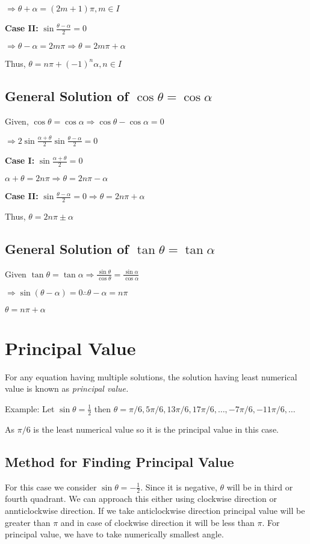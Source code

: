 $\Rightarrow \theta + \alpha = (2m + 1)\pi, m\in I$

{\bf Case II:} $\sin\frac{\theta - \alpha}{2} = 0$

$\Rightarrow \theta - \alpha = 2m\pi \Rightarrow \theta = 2m\pi + \alpha$

Thus, $\theta = n\pi + (-1)^n\alpha, n\in I$

\subsection{General Solution of $\cos\theta = \cos\alpha$}
Given, $\cos\theta = \cos\alpha \Rightarrow \cos\theta - \cos\alpha = 0$


$\Rightarrow 2\sin\frac{\alpha + \theta}{2}\sin\frac{\theta - \alpha}{2} = 0$

{\bf Case I:} $\sin\frac{\alpha + \theta}{2} = 0$

$\alpha + \theta = 2n\pi \Rightarrow \theta = 2n\pi - \alpha$

{\bf Case II:} $\sin\frac{\theta - \alpha}{2} = 0 \Rightarrow \theta = 2n\pi + \alpha$

Thus, $\theta = 2n\pi \pm\alpha$

\subsection{General Solution of $\tan\theta = \tan\alpha$}
Given $\tan\theta = \tan\alpha \Rightarrow \frac{\sin\theta}{\cos\theta} = \frac{\sin\alpha}{\cos\alpha}$

$\Rightarrow \sin(\theta - \alpha) = 0 \therefore \theta - \alpha = n\pi$

$\theta = n\pi + \alpha$

\section{Principal Value}
For any equation having multiple solutions, the solution having least numerical value is known as {\it principal value.}

Example: Let $\sin\theta = \frac{1}{2}$ then $\theta = \pi/6, 5\pi/6, 13\pi/6, 17\pi/6, \ldots, -7\pi/6, -11\pi/6,
\ldots$

As $\pi/6$ is the least numerical value so it is the principal value in this case.

\subsection{Method for Finding Principal Value}
For this case we consider $\sin\theta = -\frac{1}{2}.$ Since it is negative, $\theta$ will be in third or fourth
quadrant. We can approach this either using clockwise direction or annticlockwise direction. If we take anticlockwise direction
principal value will be greater than $\pi$ and in case of clockwise direction it will be less than $\pi.$ For principal
value, we have to take numerically smallest angle.

